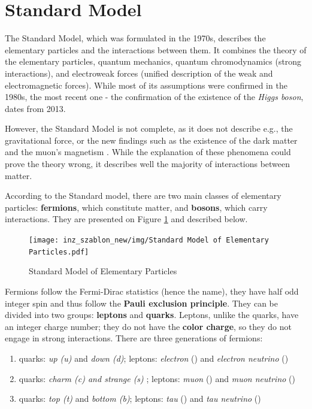 \pagestyle{fancy}
\section{Standard Model} \thispagestyle{fancy}

The Standard Model, which was formulated in the 1970s, describes the elementary particles and the interactions between them.
It combines the theory of the elementary particles, quantum mechanics, quantum chromodynamics (strong interactions), and electroweak forces (unified description of the weak and electromagnetic forces). 
While most of its assumptions were confirmed in the 1980s, the most recent one - the confirmation of the existence of the \emph{Higgs boson}, dates from 2013. \cite{zbroszczyk}

However, the Standard Model is not complete, as it does not describe e.g., the gravitational force, or the new findings such as the existence of the dark matter and the muon's magnetism \cite{standard model}. While the explanation of these phenomena could prove the theory wrong, it describes well the majority of interactions between matter.

According to the Standard model, there are two main classes of elementary particles: \textbf{fermions}, which constitute matter, and  \textbf{bosons}, which carry interactions. They are presented on Figure \ref{standard} and described below.

\begin{figure}[H]
    \centering
    \texttt{[image: inz\_szablon\_new/img/Standard Model of Elementary Particles.pdf]}
    \caption{Standard Model of Elementary Particles \cite{wiki}}
    \label{standard}
 \end{figure}

Fermions follow the Fermi-Dirac statistics (hence the name), they have half odd integer spin and thus follow the \textbf{Pauli exclusion principle}. They can be divided into two groups: \textbf{leptons} and \textbf{quarks}. Leptons, unlike the quarks, have an integer charge number; they do not have the \textbf{color charge}, so they do not engage in strong interactions. There are three generations of fermions: 
\begin{enumerate}[label=\Roman*.]
    \item quarks: \emph{up (u)} and \emph{down (d)}; leptons: \emph{electron} (\Pem) and \emph{electron neutrino} (\Pgne)
    \item quarks: \emph{charm (c) and \emph{strange (s)} }; leptons: \emph{muon} (\Pgmm) and \emph{muon neutrino} (\Pgngm) 
    \item quarks: \emph{top (t)} and \emph{bottom (b)}; leptons: \emph{tau} (\Pgtm) and \emph{tau neutrino} (\Pgngt)
\end{enumerate}

